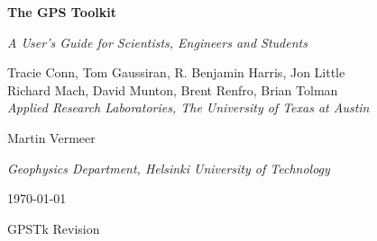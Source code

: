 
\begin{titlepage}

\begin{center}

\addvspace{30pt}


{ \Huge\bf The GPS Toolkit }

\addvspace{10pt}

{ \huge\it A User's Guide for Scientists, Engineers and Students }

\addvspace{60pt}

Tracie Conn, Tom Gaussiran, R. Benjamin Harris, Jon Little \\
Richard Mach, David Munton, Brent Renfro, Brian Tolman \\

\addvspace{3pt}
{ \it Applied Research Laboratories, The University of Texas at Austin}

\addvspace{10pt}

Martin Vermeer

\addvspace{3pt}
{ \it Geophysics Department, Helsinki University of Technology}

\addvspace{60pt}

\today



GPSTk Revision 

\end {center}

\end{titlepage}

